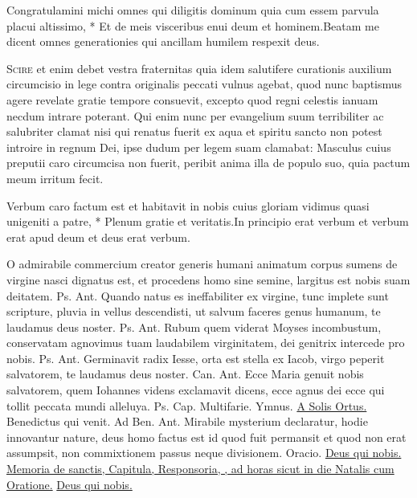 \begin{multicols*}{2}
\begin{responsory}
{Congratulamini michi omnes qui diligitis dominum quia cum essem parvula placui altissimo, * Et de meis visceribus enui deum et hominem.}{Beatam me dicent omnes generationies qui ancillam humilem respexit deus.}
\end{responsory}
\lettrine[lines=2]{\zallmancaps \color{Blue} S}{cire} et enim debet vestra fraternitas quia idem salutifere curationis auxilium circumcisio in lege contra originalis peccati vulnus agebat, quod nunc baptismus agere revelate gratie tempore consuevit, excepto quod regni celestis ianuam necdum intrare poterant. Qui enim nunc per evangelium suum terribiliter ac salubriter clamat nisi qui renatus fuerit ex aqua et spiritu sancto non potest introire in regnum Dei, ipse dudum per legem suam clamabat: Masculus cuius preputii caro circumcisa non fuerit, peribit anima illa de populo suo, quia pactum meum irritum fecit.
\begin{responsory-doxology}
{Verbum caro factum est et habitavit in nobis cuius gloriam vidimus quasi unigeniti a patre, * Plenum gratie et veritatis.}{In principio erat verbum et verbum erat apud deum et deus erat verbum.}
\end{responsory-doxology}
 O admirabile commercium creator generis humani animatum corpus sumens de virgine nasci dignatus est, et procedens homo sine semine, largitus est nobis suam deitatem. {\color{Red} Ps.}  {\color{Red} Ant.} Quando natus es ineffabiliter ex virgine, tunc implete sunt scripture, pluvia in vellus descendisti, ut salvum faceres genus humanum, te laudamus deus noster. {\color{Red} Ps.}  {\color{Red} Ant.} Rubum quem viderat Moyses incombustum, conservatam agnovimus tuam laudabilem virginitatem, dei genitrix intercede pro nobis. {\color{Red} Ps.}  {\color{Red} Ant.} Germinavit radix Iesse, orta est stella ex Iacob, virgo peperit salvatorem, te laudamus deus noster. {\color{Red} Can.}  {\color{Red} Ant.} Ecce Maria genuit nobis salvatorem, quem Iohannes videns exclamavit dicens, ecce agnus dei ecce qui tollit peccata mundi alleluya. {\color{Red} Ps.}  {\color{Red} Cap.} Multifarie. {\color{Red} Ymnus.} \hyperlink{a-solis-ortus}{A Solis Ortus.} \V Benedictus qui venit. {\color{Red} Ad Ben. Ant.} Mirabile mysterium declaratur, hodie innovantur nature, deus homo factus est id quod fuit permansit et quod non erat assumpsit, non commixtionem passus neque divisionem. {\color{Red} Oracio.} \hyperlink{deus-nobis-circumcisionis}{Deus qui nobis.} \ul{Memoria de sanctis, Capitula, Responsoria, \Vbar , ad horas sicut in die Natalis cum Oratione.} \hyperlink{deus-nobis-circumcisionis}{Deus qui nobis.}

\end{multicols*}
